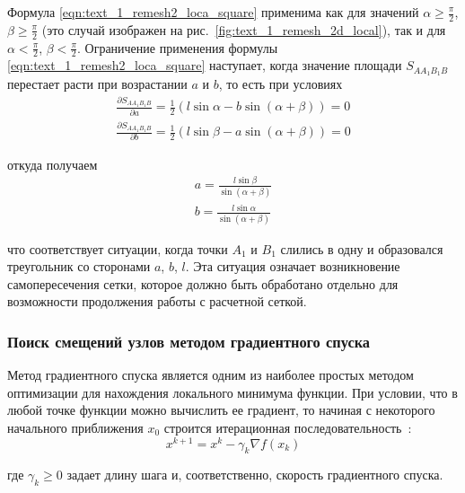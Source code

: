 Формула \eqref{eqn:text_1_remesh2_loca_square} применима как для значений $\alpha \ge \frac{\pi}{2}$, $\beta \ge \frac{\pi}{2}$ (это случай изображен на рис.~\ref{fig:text_1_remesh_2d_local}), так и для $\alpha < \frac{\pi}{2}$, $\beta < \frac{\pi}{2}$.
Ограничение применения формулы \eqref{eqn:text_1_remesh2_loca_square} наступает, когда значение площади $S_{AA_1B_1B}$ перестает расти при возрастании $a$ и $b$, то есть при условиях
\begin{equation}
	\begin{aligned}
		\frac{\partial S_{AA_1B_1B}}{\partial a} = \frac{1}{2}(l \sin \alpha - b \sin (\alpha + \beta)) = 0 \\
		\frac{\partial S_{AA_1B_1B}}{\partial b} = \frac{1}{2}(l \sin \beta - a \sin (\alpha + \beta)) = 0
	\end{aligned}
\end{equation}

откуда получаем
\begin{equation}
	\begin{aligned}
		a = \frac{l \sin \beta}{\sin (\alpha + \beta)} \\
		b = \frac{l \sin \alpha}{\sin (\alpha + \beta)}
	\end{aligned}
\end{equation}

что соответствует ситуации, когда точки $A_1$ и $B_1$ слились в одну и образовался треугольник со сторонами $a$, $b$, $l$.
Эта ситуация означает возникновение самопересечения сетки, которое должно быть обработано отдельно для возможности продолжения работы с расчетной сеткой.

\subsubsection{Поиск смещений узлов методом градиентного спуска}

Метод градиентного спуска\label{term:gradient_spusk} является одним из наиболее простых методом оптимизации для нахождения локального минимума функции.
При условии, что в любой точке функции можно вычислить ее градиент, то начиная с некоторого начального приближения $x_0$ строится итерационная последовательность~\cite{Kantorovich1984Func}:
\begin{equation}
x^{k+1} = x^k - \gamma_k \nabla f(x_k)
\end{equation}

где $\gamma_k \ge 0$ задает длину шага и, соответственно, скорость градиентного спуска.


